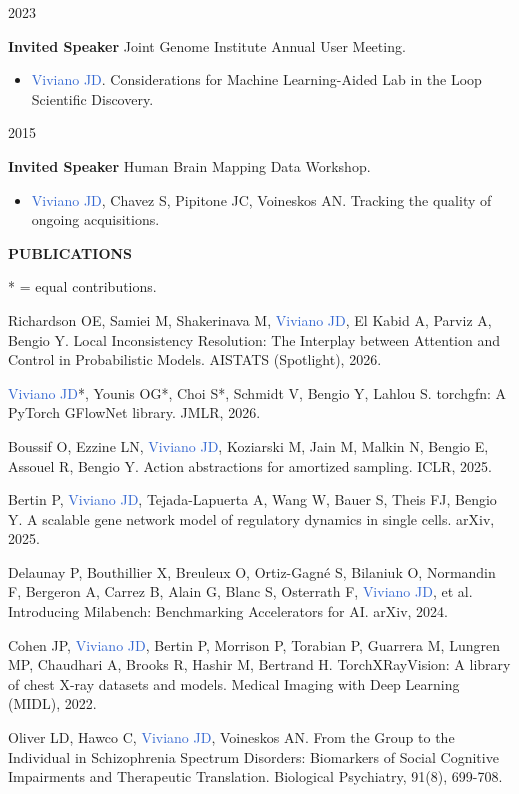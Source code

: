 \documentclass[a4paper,11pt,oneside]{book}
\newcommand{\externallink}{%
    \hspace{1pt}\tikz[x=1.2ex, y=1.2ex, baseline=-0.05ex]{%
        \begin{scope}[x=1ex, y=1ex]
            \clip (-0.1,-0.1)
                --++ (-0, 1.2)
                --++ (0.6, 0)
                --++ (0, -0.6)
                --++ (0.6, 0)
                --++ (0, -1);
            \path[draw,
                line width = 0.5,
                rounded corners=0.5]
                (0,0) rectangle (1,1);
        \end{scope}
        \path[draw, line width = 0.5] (0.5, 0.5)
            -- (1, 1);
        \path[draw, line width = 0.5] (0.6, 1)
            -- (1, 1) -- (1, 0.6);
        }
    }
\newcommand\link[2]{\href{#1}{#2 \externallink}}
\newcommand{\entrytext}[4]{%
  \parbox[t]{2.5cm}{#1\hfill}\hspace{0cm}\parbox[t]{11.8cm}{%
    \textbf{#2}%
    \hfill%
    {\footnotesize\addfontfeature{Color=lightgray} #3}\
    \vspace{1.2mm}
    \begin{itemize}[leftmargin=-1.5cm,itemsep=0.8mm]\item[]#4\end{itemize}\vspace{0.8\parsep}%
  }}
\newcommand\sectionheading[1]{
    \normalsize
    \noindent
    \leftskip=0in
    \textbf{#1\\
    \vspace{3.5mm}}
}
\newcommand\paper[1]{
    #1\\
    \vspace{3.5mm}
}
\begin{document}
\begin{flushleft}
\entrytext
{2023}
{Invited Speaker}
{Joint Genome Institute Annual User Meeting.}
{\textcolor{highlight}{Viviano JD}. Considerations for Machine Learning-Aided Lab in the Loop Scientific Discovery.}

\entrytext
{2015}
{Invited Speaker}
{Human Brain Mapping Data Workshop.}
{\textcolor{highlight}{Viviano JD}, Chavez S, Pipitone JC, Voineskos AN. Tracking the quality of ongoing acquisitions.}


\sectionheading{PUBLICATIONS}

\paper{* = equal contributions.} %

\paper{Richardson OE, Samiei M, Shakerinava M, \textcolor{highlight}{Viviano JD}, El Kabid A, Parviz A, Bengio Y. Local Inconsistency Resolution: The Interplay between Attention and Control in Probabilistic Models. AISTATS (Spotlight), 2026.}

\paper{\textcolor{highlight}{Viviano JD}*, Younis OG*, Choi S*, Schmidt V, Bengio Y, Lahlou S. torchgfn: A PyTorch GFlowNet library. JMLR, 2026.}

\paper{Boussif O, Ezzine LN, \textcolor{highlight}{Viviano JD}, Koziarski M, Jain M, Malkin N, Bengio E, Assouel R, Bengio Y. Action abstractions for amortized sampling. ICLR, 2025.}

\paper{Bertin P, \textcolor{highlight}{Viviano JD}, Tejada-Lapuerta A, Wang W, Bauer S, Theis FJ, Bengio Y. A scalable gene network model of regulatory dynamics in single cells. arXiv, 2025.}

\paper{Delaunay P, Bouthillier X, Breuleux O, Ortiz-Gagné S, Bilaniuk O, Normandin F, Bergeron A, Carrez B, Alain G, Blanc S, Osterrath F, \textcolor{highlight}{Viviano JD}, et al. Introducing Milabench: Benchmarking Accelerators for AI. arXiv, 2024.}

\paper{Cohen JP, \textcolor{highlight}{Viviano JD}, Bertin P, Morrison P, Torabian P, Guarrera M, Lungren MP, Chaudhari A, Brooks R, Hashir M, Bertrand H. TorchXRayVision: A library of chest X-ray datasets and models. Medical Imaging with Deep Learning (MIDL), 2022.}

\paper{Oliver LD, Hawco C, \textcolor{highlight}{Viviano JD}, Voineskos AN. From the Group to the Individual in Schizophrenia Spectrum Disorders: Biomarkers of Social Cognitive Impairments and Therapeutic Translation. Biological Psychiatry, 91(8), 699-708.}


\end{flushleft}
\end{document}
